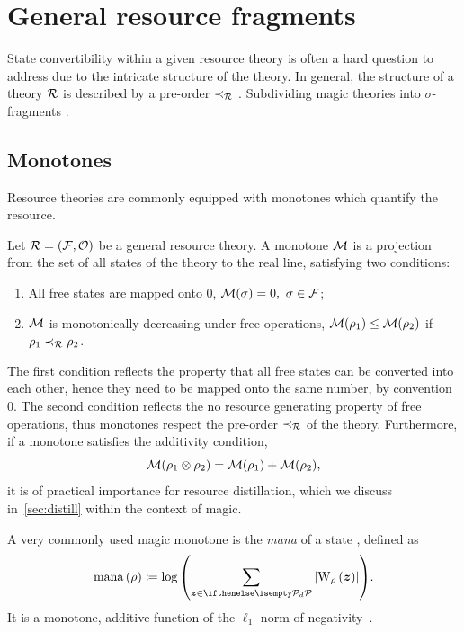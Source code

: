 \section{General resource fragments}
\label{sec:frag}

State convertibility within a given resource theory is often a hard question to address due to the intricate structure of the theory.
In general, the structure of a theory $\mathcal{R}$ is described by a pre-order $\prec_{\mathcal{R}}$ .
Subdividing magic theories into $\sigma$-fragments .
\subsection{Monotones}\label{sec:mono}

Resource theories are commonly equipped with monotones which quantify the resource. 
\begin{definition}\label{def:mono}
    Let $\mathcal{R} = (\mathcal{F}, \mathcal{O})$ be a general resource theory.
    A monotone $\mathcal{M}$ is a projection from the set of all states of the theory to the real line, satisfying two conditions:
    \begin{enumerate}
        \item All free states are mapped onto 0, $\mathcal{M}(\sigma) = 0,\ \sigma \in \mathcal{F}$;
        \item $\mathcal{M}$ is monotonically decreasing under free operations, $\mathcal{M}(\rho_1) \leq \mathcal{M}(\rho_2)$ if $\rho_1 \prec_{\mathcal{R}} \rho_2$.
    \end{enumerate}
\end{definition}
The first condition reflects the property that all free states can be converted into each other, hence they need to be mapped onto the same number, by convention 0.
The second condition reflects the no resource generating property of free operations, thus monotones respect the pre-order $\prec_{\mathcal{R}}$ of the theory.
Furthermore, if a monotone satisfies the additivity condition,
\begin{equation}
    \mathcal{M}(\rho_1 \otimes \rho_2) = \mathcal{M}(\rho_1) + \mathcal{M}(\rho_2),
\end{equation}
it is of practical importance for resource distillation, which we discuss in~\cref{sec:distill} within the context of magic.

A very commonly used magic monotone is the \emph{mana} of a state , defined as
\begin{equation}
    \mana{\rho} \coloneqq \log{\left(\sum\limits_{\bmz \in \pd} \abs{\W[\bmz]{\rho}}\right)}.
\end{equation}
It is a monotone, additive function of the $\ell_1$-norm of negativity~.

